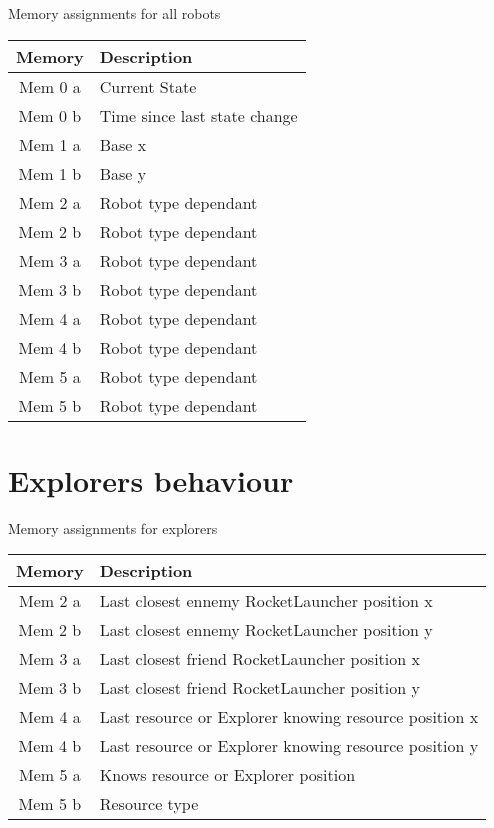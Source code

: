 \documentclass{article}
\begin{document}
\begin{table}[ht]
	Memory assignments for all robots\\
	\begin{tabular}{|c|l|}
		\hline
		Memory & Description\\
		\hline
		Mem 0 a & Current State\\
		Mem 0 b & Time since last state change\\
		\hline
		Mem 1 a & Base x\\
		Mem 1 b & Base y\\
		\hline
		Mem 2 a & Robot type dependant\\
		Mem 2 b & Robot type dependant\\
		\hline
		Mem 3 a & Robot type dependant\\
		Mem 3 b & Robot type dependant\\
		\hline
		Mem 4 a & Robot type dependant\\
		Mem 4 b & Robot type dependant\\
		\hline
		Mem 5 a & Robot type dependant\\
		Mem 5 b & Robot type dependant\\
		\hline
	\end{tabular}
\end{table}

\section{Explorers behaviour}

\begin{table}[ht]
	Memory assignments for explorers\\
	\begin{tabular}{|c|l|}
		\hline
		Memory & Description\\
		\hline
		Mem 2 a & Last closest ennemy RocketLauncher position x\\
		Mem 2 b & Last closest ennemy RocketLauncher position y\\
		\hline
		Mem 3 a & Last closest friend RocketLauncher position x\\
		Mem 3 b & Last closest friend RocketLauncher position y\\
		\hline
		Mem 4 a & Last resource or Explorer knowing resource position x\\
		Mem 4 b & Last resource or Explorer knowing resource position y\\
		\hline
		Mem 5 a & Knows resource or Explorer position\\
		Mem 5 b & Resource type\\
		\hline
	\end{tabular}
\end{table}
\end{document}
